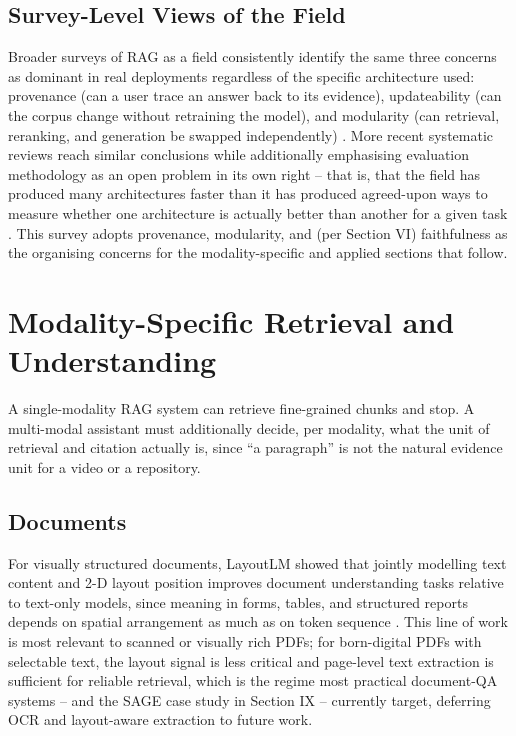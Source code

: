 \documentclass[conference]{IEEEtran}
\begin{document}
\subsection{Survey-Level Views of the Field}
Broader surveys of RAG as a field consistently identify the same three
concerns as dominant in real deployments regardless of the specific
architecture used: provenance (can a user trace an answer back to its
evidence), updateability (can the corpus change without retraining the
model), and modularity (can retrieval, reranking, and generation be
swapped independently) \cite{gao2023ragsurvey}. More recent systematic
reviews reach similar conclusions while additionally emphasising
evaluation methodology as an open problem in its own right -- that is,
that the field has produced many architectures faster than it has
produced agreed-upon ways to measure whether one architecture is
actually better than another for a given task \cite{slr2025rag,ragevalsurvey2025}.
This survey adopts provenance, modularity, and (per Section VI)
faithfulness as the organising concerns for the modality-specific and
applied sections that follow.

\section{Modality-Specific Retrieval and Understanding}

A single-modality RAG system can retrieve fine-grained chunks and stop.
A multi-modal assistant must additionally decide, per modality, what the
unit of retrieval and citation actually is, since ``a paragraph'' is not
the natural evidence unit for a video or a repository.

\subsection{Documents}
For visually structured documents, LayoutLM showed that jointly modelling
text content and 2-D layout position improves document understanding
tasks relative to text-only models, since meaning in forms, tables, and
structured reports depends on spatial arrangement as much as on token
sequence \cite{xu2020layoutlm}. This line of work is most relevant to
scanned or visually rich PDFs; for born-digital PDFs with selectable
text, the layout signal is less critical and page-level text extraction
is sufficient for reliable retrieval, which is the regime most practical
document-QA systems -- and the SAGE case study in Section IX -- currently
target, deferring OCR and layout-aware extraction to future work.
\end{document}
